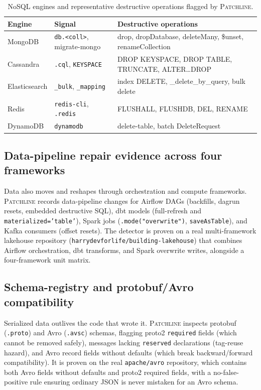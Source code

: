 \documentclass[11pt]{article}
\newcommand{\tool}{\textsc{Patchline}}
\newcommand{\code}[1]{\texttt{#1}}
\begin{document}
\begin{table}[h]\centering\small
\caption{NoSQL engines and representative destructive operations flagged by \tool.}
\label{tab:nosql}
\begin{tabular}{>{\raggedright\arraybackslash}p{2.6cm}>{\raggedright\arraybackslash}p{4.2cm}>{\raggedright\arraybackslash}p{6.0cm}}
\toprule
\textbf{Engine} & \textbf{Signal} & \textbf{Destructive operations} \\
\midrule
MongoDB & \code{db.<coll>}, migrate-mongo & drop, dropDatabase, deleteMany, \$unset, renameCollection \\
Cassandra & \code{.cql}, \code{KEYSPACE} & DROP KEYSPACE, DROP TABLE, TRUNCATE, ALTER\ldots DROP \\
Elasticsearch & \code{\_bulk}, \code{\_mapping} & index DELETE, \_delete\_by\_query, bulk delete \\
Redis & \code{redis-cli}, \code{.redis} & FLUSHALL, FLUSHDB, DEL, RENAME \\
DynamoDB & \code{dynamodb} & delete-table, batch DeleteRequest \\
\bottomrule
\end{tabular}
\end{table}

\subsection{Data-pipeline repair evidence across four frameworks}
Data also moves and reshapes through orchestration and compute frameworks. \tool{} records
data-pipeline changes for Airflow DAGs (backfills, dagrun resets, embedded destructive SQL), dbt
models (full-refresh and \code{materialized='table'}), Spark jobs (\code{.mode("overwrite")},
\code{saveAsTable}), and Kafka consumers (offset resets). The detector is proven on a real
multi-framework lakehouse repository (\code{harrydevforlife/building-lakehouse}) that combines Airflow
orchestration, dbt transforms, and Spark overwrite writes, alongside a four-framework unit matrix.

\subsection{Schema-registry and protobuf/Avro compatibility}
Serialized data outlives the code that wrote it. \tool{} inspects protobuf (\code{.proto}) and Avro
(\code{.avsc}) schemas, flagging proto2 \code{required} fields (which cannot be removed safely),
messages lacking \code{reserved} declarations (tag-reuse hazard), and Avro record fields without
defaults (which break backward/forward compatibility). It is proven on the real \code{apache/avro}
repository, which contains both Avro fields without defaults and proto2 required fields, with a
no-false-positive rule ensuring ordinary JSON is never mistaken for an Avro schema.
\end{document}

